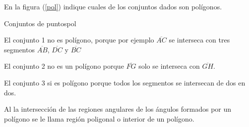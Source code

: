 \begin{ejemplo}{En la figura (\ref{pol}) indique cuales de los conjuntos dados son polígonos.}
\begin{figura}
{}{Conjuntos de puntos}{pol}
\end{figura}
\solucion
\begin{lista}
 \item El conjunto 1 no es polígono, porque por ejemplo $\overline{AC}$ se interseca
con tres segmentos $\overline{AB}$, $\overline{DC}$ y $\overline{BC}$
\item El conjunto 2 no es un polígono porque $\overline{FG}$ solo se interseca
con $\overline{GH}$.
\item El conjunto 3 si es polígono porque todos los segmentos se intersecan de dos en dos.
\end{lista}
\end{ejemplo}
\nota Al la intersección de las regiones angulares de los ángulos formados por un polígono se le llama región poligonal o interior de un polígono. 
